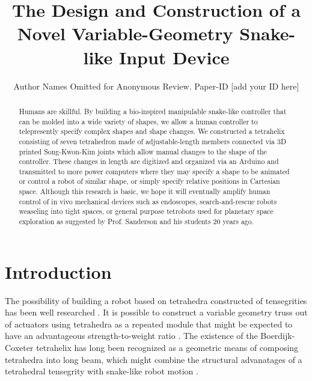\documentclass[conference]{IEEEtran}
\begin{document}
\title{The Design and Construction of a Novel Variable-Geometry Snake-like Input Device}

\author{Author Names Omitted for Anonymous Review. Paper-ID [add your ID here]}



\maketitle

\begin{abstract}
  Humans are skillful.
  By building a bio-inspired manipulable snake-like controller that can be
  molded into a wide variety of shapes, we allow a human controller to telepresently
  specify complex shapes and shape changes.
  We constructed a tetrahelix consisting of seven tetrahedron made of
  adjustable-length members connected via 3D printed Song-Kwon-Kim joints which
  allow manual changes to the shape of the controller. These changes in length are
  digitized and organized via an Arduino and transmitted to more power computers
  where they may specify a shape to be animated or control a robot of similar shape,
  or simply specify relative positions in Cartesian space. Although this research is basic,
  we hope it will eventually amplify human control of in vivo mechanical devices such as
  endoscopes, search-and-rescue robots weaseling into tight spaces, or general purpose
  tetrobots used for planetary space exploration as suggested by
  Prof. Sanderson and his students 20 years ago.
\end{abstract}

\IEEEpeerreviewmaketitle


\section{Introduction}

The possibility of building a robot based on tetrahedra constructed of
tensegrities has been well researched \citet{TetrobotBook,NTRT,paul2006,chen2017soft}.
It is possible to construct a variable geometry truss out of actuators
using tetrahedra as a repeated module that might be expected to have
an advantageous strength-to-weight ratio \citet{mikulas1985sequentially,mirletz2014}.
The existence of the Boerdijk-Coxeter tetrahelix\citet{coxeter1985simplicial}
has long been recognized \citet{fuller1982synergetics,graytetrahelix} as a
geometric means of composing tetrahedra into long beam, which
might combine the structural advanatages of a tetrahedral tensegrity with
snake-like robot motion \citet{hirose1993biologically,liljebäck2012snake}.
\end{document}
